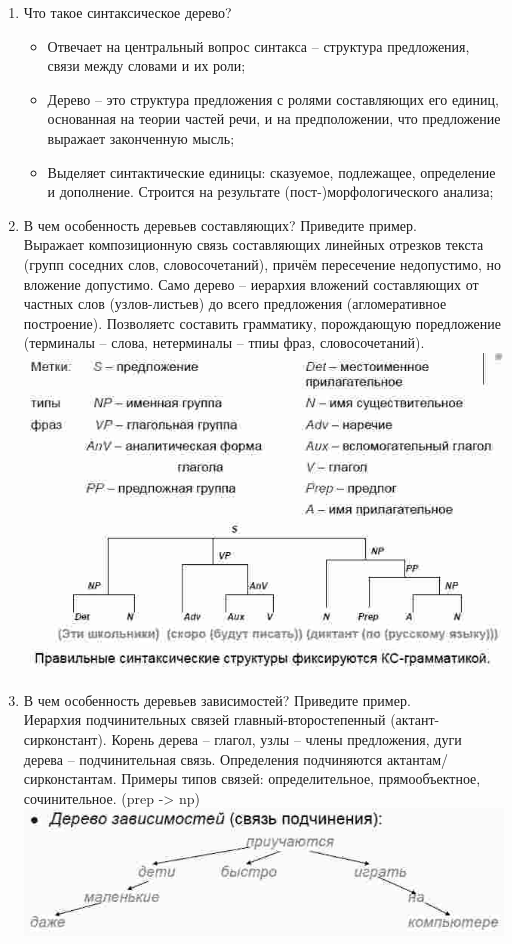 \documentclass[a4paper]{article}
\begin{document}
\begin{enumerate}
	\item Что такое синтаксическое дерево?\hfill\\ \begin{itemize}
		\item Отвечает на центральный вопрос синтакса -- структура предложения, связи между словами и их роли;
		\item Дерево -- это структура предложения с ролями составляющих его единиц, основанная на теории частей речи, и на предположении, что предложение выражает законченную мысль;
		\item Выделяет синтактические единицы: сказуемое, подлежащее, определение и дополнение. Строится на результате (пост-)морфологического анализа;
	\end{itemize}

	\item В чем особенность деревьев составляющих? Приведите пример.\hfill\\
	Выражает композиционную связь составляющих линейных отрезков текста (групп соседних слов, словосочетаний), причём пересечение недопустимо, но вложение допустимо. Само дерево -- иерархия вложений составляющих от частных слов (узлов-листьев) до всего предложения (агломеративное построение). Позволяетс составить грамматику, порождающую поредложение (терминалы -- слова, нетерминалы -- тпиы фраз, словосочетаний).\hfill\\
	\includegraphics[scale=0.5]{constituent_tree}

	\item В чем особенность деревьев зависимостей? Приведите пример.\hfill\\
	Иерархия подчинительных связей главный-второстепенный (актант-сирконстант). Корень дерева -- глагол, узлы -- члены предложения, дуги дерева -- подчинительная связь. Определения подчиняются актантам/сирконстантам. Примеры типов связей: определительное, прямообъектное, сочинительное. (prep -> np)\hfill\\
	\includegraphics[scale=0.5]{subordination_tree}


\end{enumerate}
\end{document}
